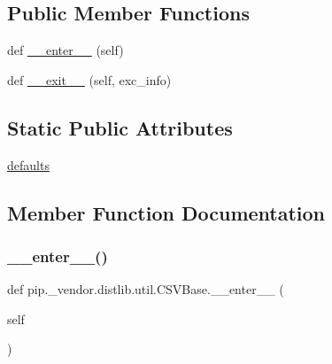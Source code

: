 \subsection*{Public Member Functions}
\begin{DoxyCompactItemize}
\item 
def \hyperlink{classpip_1_1__vendor_1_1distlib_1_1util_1_1CSVBase_a362cc11f02c74a5bd6f3f34fcabbf7c5}{\+\_\+\+\_\+enter\+\_\+\+\_\+} (self)
\item 
def \hyperlink{classpip_1_1__vendor_1_1distlib_1_1util_1_1CSVBase_a0f2a69e08588ba213e9594fe42bfef01}{\+\_\+\+\_\+exit\+\_\+\+\_\+} (self, exc\+\_\+info)
\end{DoxyCompactItemize}
\subsection*{Static Public Attributes}
\begin{DoxyCompactItemize}
\item 
\hyperlink{classpip_1_1__vendor_1_1distlib_1_1util_1_1CSVBase_adb629c8c813b8b0884a9b1dbdb5ab085}{defaults}
\end{DoxyCompactItemize}


\subsection{Member Function Documentation}
\mbox{\label{classpip_1_1__vendor_1_1distlib_1_1util_1_1CSVBase_a362cc11f02c74a5bd6f3f34fcabbf7c5}} 
\subsubsection{\texorpdfstring{\+\_\+\+\_\+enter\+\_\+\+\_\+()}{\_\_enter\_\_()}}
{\footnotesize\ttfamily def pip.\+\_\+vendor.\+distlib.\+util.\+C\+S\+V\+Base.\+\_\+\+\_\+enter\+\_\+\+\_\+ (\begin{DoxyParamCaption}\item[{}]{self }\end{DoxyParamCaption})}

\mbox{\label{classpip_1_1__vendor_1_1distlib_1_1util_1_1CSVBase_a0f2a69e08588ba213e9594fe42bfef01}} 
